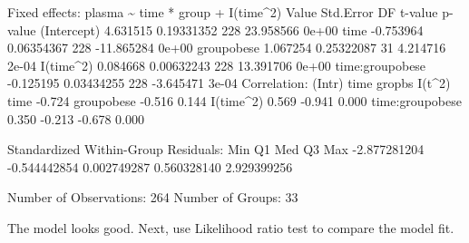 \documentclass[
]{article}
\newenvironment{Shaded}{\begin{snugshade}}{\end{snugshade}}
\newcommand{\DecValTok}[1]{\textcolor[rgb]{0.00,0.00,0.81}{#1}}
\newcommand{\FloatTok}[1]{\textcolor[rgb]{0.00,0.00,0.81}{#1}}
\newcommand{\FunctionTok}[1]{\textcolor[rgb]{0.00,0.00,0.00}{#1}}
\newcommand{\NormalTok}[1]{#1}
\newcommand{\SpecialCharTok}[1]{\textcolor[rgb]{0.00,0.00,0.00}{#1}}
\begin{document}
\begin{Shaded}
\begin{Highlighting}[]
\NormalTok{Fixed effects}\SpecialCharTok{:}\NormalTok{  plasma }\SpecialCharTok{\textasciitilde{}}\NormalTok{ time }\SpecialCharTok{*}\NormalTok{ group }\SpecialCharTok{+} \FunctionTok{I}\NormalTok{(time}\SpecialCharTok{\^{}}\DecValTok{2}\NormalTok{) }
\NormalTok{                    Value  Std.Error  DF    t}\SpecialCharTok{{-}}\NormalTok{value p}\SpecialCharTok{{-}}\NormalTok{value}
\NormalTok{(Intercept)      }\FloatTok{4.631515} \FloatTok{0.19331352} \DecValTok{228}  \FloatTok{23.958566}   \FloatTok{0e+00}
\NormalTok{time            }\SpecialCharTok{{-}}\FloatTok{0.753964} \FloatTok{0.06354367} \DecValTok{228} \SpecialCharTok{{-}}\FloatTok{11.865284}   \FloatTok{0e+00}
\NormalTok{groupobese       }\FloatTok{1.067254} \FloatTok{0.25322087}  \DecValTok{31}   \FloatTok{4.214716}   \FloatTok{2e{-}04}
\FunctionTok{I}\NormalTok{(time}\SpecialCharTok{\^{}}\DecValTok{2}\NormalTok{)        }\FloatTok{0.084668} \FloatTok{0.00632243} \DecValTok{228}  \FloatTok{13.391706}   \FloatTok{0e+00}
\NormalTok{time}\SpecialCharTok{:}\NormalTok{groupobese }\SpecialCharTok{{-}}\FloatTok{0.125195} \FloatTok{0.03434255} \DecValTok{228}  \SpecialCharTok{{-}}\FloatTok{3.645471}   \FloatTok{3e{-}04}
\NormalTok{ Correlation}\SpecialCharTok{:} 
\NormalTok{                (Intr) time   gropbs }\FunctionTok{I}\NormalTok{(t}\SpecialCharTok{\^{}}\DecValTok{2}\NormalTok{)}
\NormalTok{time            }\SpecialCharTok{{-}}\FloatTok{0.724}                     
\NormalTok{groupobese      }\SpecialCharTok{{-}}\FloatTok{0.516}  \FloatTok{0.144}              
\FunctionTok{I}\NormalTok{(time}\SpecialCharTok{\^{}}\DecValTok{2}\NormalTok{)        }\FloatTok{0.569} \SpecialCharTok{{-}}\FloatTok{0.941}  \FloatTok{0.000}       
\NormalTok{time}\SpecialCharTok{:}\NormalTok{groupobese  }\FloatTok{0.350} \SpecialCharTok{{-}}\FloatTok{0.213} \SpecialCharTok{{-}}\FloatTok{0.678}  \FloatTok{0.000}

\NormalTok{Standardized Within}\SpecialCharTok{{-}}\NormalTok{Group Residuals}\SpecialCharTok{:}
\NormalTok{         Min           Q1          Med           Q3          Max }
\SpecialCharTok{{-}}\FloatTok{2.877281204} \SpecialCharTok{{-}}\FloatTok{0.544442854}  \FloatTok{0.002749287}  \FloatTok{0.560328140}  \FloatTok{2.929399256} 

\NormalTok{Number of Observations}\SpecialCharTok{:} \DecValTok{264}
\NormalTok{Number of Groups}\SpecialCharTok{:} \DecValTok{33} 
\end{Highlighting}
\end{Shaded}

The model looks good. Next, use Likelihood ratio test to compare the
model fit.
\end{document}
